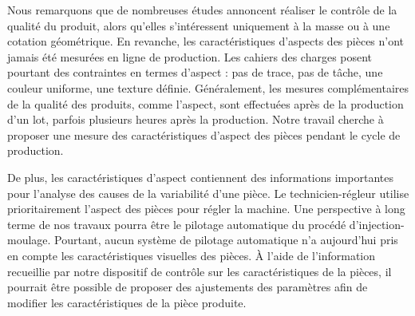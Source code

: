 Nous remarquons que de nombreuses études annoncent réaliser le contrôle de la qualité du produit, alors qu'elles s'intéressent uniquement à la masse ou à une cotation géométrique.
En revanche, les caractéristiques d'aspects des pièces n'ont jamais été mesurées en ligne de production.
Les cahiers des charges posent pourtant des contraintes en termes d'aspect : pas de trace, pas de tâche, une couleur uniforme, une texture définie.
Généralement, les mesures complémentaires de la qualité des produits, comme l'aspect, sont effectuées après de la production d'un lot, parfois plusieurs heures après la production.
Notre travail cherche à proposer une mesure des caractéristiques d'aspect des pièces pendant le cycle de production.

De plus, les caractéristiques d'aspect contiennent des informations importantes pour l'analyse des causes de la variabilité d'une pièce. %
Le technicien-régleur utilise prioritairement l'aspect des pièces pour régler la machine.
Une perspective à long terme de nos travaux pourra être le pilotage automatique du procédé d'injection-moulage.
Pourtant, aucun système de pilotage automatique n'a aujourd'hui pris en compte les caractéristiques visuelles des pièces.
À l'aide de l'information recueillie par notre dispositif de contrôle sur les caractéristiques de la pièces, il pourrait être possible de proposer des ajustements des paramètres afin de modifier les caractéristiques de la pièce produite.


